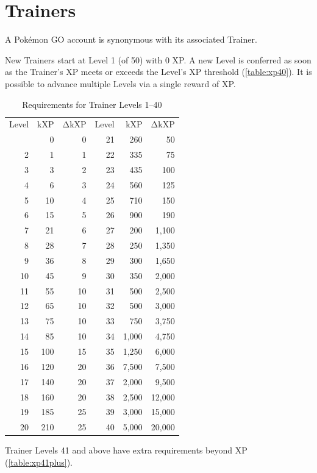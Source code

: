 \chapter{Trainers}
A Pokémon GO account is synonymous with its associated Trainer.

New Trainers start at Level 1 (of 50) with 0 XP\@.
A new Level is conferred as soon as the Trainer's XP meets or exceeds
  the Level's XP threshold (\autoref{table:xp40}).
It is possible to advance multiple Levels via a single reward of XP\@.
\begin{table}[hb]
\begin{center}
\begin{tabular}{r r r|r r r}
  Level & kXP & ΔkXP & Level & kXP & ΔkXP \\
\Midrule
1 & 0 & 0 & 21 & 260 & 50 \\
2 & 1 & 1 & 22 & 335 & 75 \\
3 & 3 & 2 & 23 & 435 & 100 \\
4 & 6 & 3 & 24 & 560 & 125 \\
5 & 10 & 4 & 25 & 710 & 150 \\
6 & 15 & 5 & 26 & 900 & 190 \\
7 & 21 & 6 & 27 & 200 & 1,100 \\
8 & 28 & 7 & 28 & 250 & 1,350 \\
9 & 36 & 8 & 29 & 300 & 1,650 \\
10 & 45 & 9 & 30 & 350 & 2,000 \\
11 & 55 & 10 & 31 & 500 & 2,500 \\
12 & 65 & 10 & 32 & 500 & 3,000 \\
13 & 75 & 10 & 33 & 750 & 3,750 \\
14 & 85 & 10 & 34 & 1,000 & 4,750 \\
15 & 100 & 15 & 35 & 1,250 & 6,000 \\
16 & 120 & 20 & 36 & 7,500 & 7,500 \\
17 & 140 & 20 & 37 & 2,000 & 9,500 \\
18 & 160 & 20 & 38 & 2,500 & 12,000 \\
19 & 185 & 25 & 39 & 3,000 & 15,000 \\
20 & 210 & 25 & 40 & 5,000 & 20,000 \\
\end{tabular}
\caption{Requirements for Trainer Levels 1--40}
\label{table:xp40}
\end{center}
\end{table}
Trainer Levels 41 and above have extra requirements beyond XP (\autoref{table:xp41plus}).
